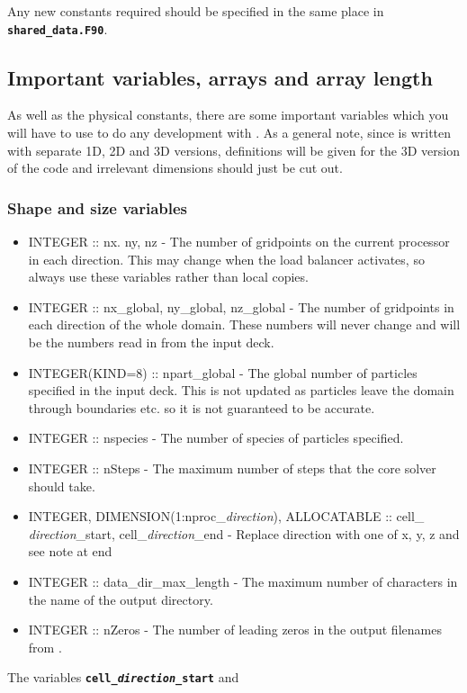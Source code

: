 \documentclass[12pt,a4paper]{article}
\newcommand{\inlinecode}[1]{{\color{warwickred} \bf\texttt{#1}}}
\newcommand{\EPOCH}{{\color{warwickdark}\fontfamily{phv}\selectfont{EPOCH}}}
\begin{document}
Any new constants required should be specified in the same place in
\inlinecode{shared\_data.F90}.

\subsection{Important variables, arrays and array length}
As well as the physical constants, there are some important variables which
you will have to use to do any development with \EPOCH. As a general note,
since {\EPOCH} is written with separate 1D, 2D and 3D versions, definitions will
be given for the 3D version of the code and irrelevant dimensions should just
be cut out.

\subsubsection{Shape and size variables}
\begin{itemize}
\item INTEGER :: nx. ny, nz - The number of gridpoints on the current
  processor in each direction. This may change when the load balancer
  activates, so always use these variables rather than local copies.
\item INTEGER :: nx\_global, ny\_global, nz\_global - The number of gridpoints
  in each direction of the whole domain. These numbers will never change and
  will be the numbers read in from the input deck.
\item INTEGER(KIND=8) :: npart\_global - The global number of particles
  specified in the input deck. This is not updated as particles leave the
  domain through boundaries etc. so it is not guaranteed to be accurate.
\item INTEGER :: nspecies - The number of species of particles specified.
\item INTEGER :: nSteps - The maximum number of steps that the core solver
  should take.
\item INTEGER, DIMENSION(1:nproc\_{\it direction}), ALLOCATABLE :: cell\_{\it
    direction}\_start, cell\_{\it direction}\_end - Replace direction with one
  of x, y, z and see note at end
\item INTEGER :: data\_dir\_max\_length - The maximum number of characters in
  the name of the output directory.
\item INTEGER :: nZeros - The number of leading zeros in the output filenames
  from \EPOCH.
\end{itemize}
The variables \inlinecode{cell\_{\it direction}\_start} and
\end{document}
